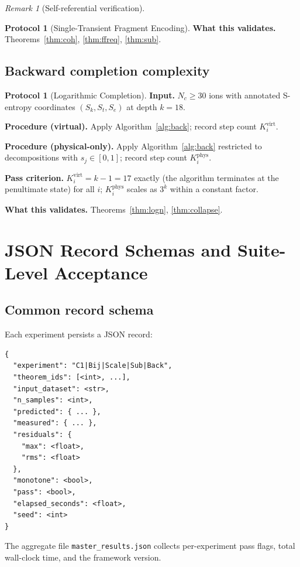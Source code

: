 \documentclass[twocolumn,10pt,a4paper]{article}
\theoremstyle{thmstyle}
\theoremstyle{definition}
\newtheorem{protocol}[theorem]{Protocol}
\theoremstyle{remark}
\newtheorem{remark}[theorem]{Remark}
\begin{document}
\begin{remark}[Self-referential verification]
\begin{protocol}[Single-Transient Fragment Encoding]
\textbf{What this validates.} Theorems~\ref{thm:coh}, \ref{thm:ffreq},
\ref{thm:sub}.
\end{protocol}

\subsection{Backward completion complexity}

\begin{protocol}[Logarithmic Completion]
\label{prot:back}
\textbf{Input.} $N_{c}\geq 30$ ions with annotated S-entropy
coordinates $(S_{k},S_{t},S_{e})$ at depth $k=18$.

\textbf{Procedure (virtual).} Apply Algorithm~\ref{alg:back}; record
step count $K_{i}^{\mathrm{virt}}$.

\textbf{Procedure (physical-only).} Apply Algorithm~\ref{alg:back}
restricted to decompositions with $s_{j}\in[0,1]$; record step count
$K_{i}^{\mathrm{phys}}$.

\textbf{Pass criterion.} $K_{i}^{\mathrm{virt}}=k-1=17$ exactly (the
algorithm terminates at the penultimate state) for all $i$;
$K_{i}^{\mathrm{phys}}$ scales as $3^{k}$ within a constant factor.

\textbf{What this validates.} Theorems~\ref{thm:logn}, \ref{thm:collapse}.
\end{protocol}

\section{JSON Record Schemas and Suite-Level Acceptance}
\label{sec:json}

\subsection{Common record schema}

Each experiment persists a JSON record:
\begin{verbatim}
{
  "experiment": "C1|Bij|Scale|Sub|Back",
  "theorem_ids": [<int>, ...],
  "input_dataset": <str>,
  "n_samples": <int>,
  "predicted": { ... },
  "measured": { ... },
  "residuals": {
    "max": <float>,
    "rms": <float>
  },
  "monotone": <bool>,
  "pass": <bool>,
  "elapsed_seconds": <float>,
  "seed": <int>
}
\end{verbatim}

The aggregate file \texttt{master\_results.json} collects per-experiment
pass flags, total wall-clock time, and the framework version.


\end{remark}
\end{document}
